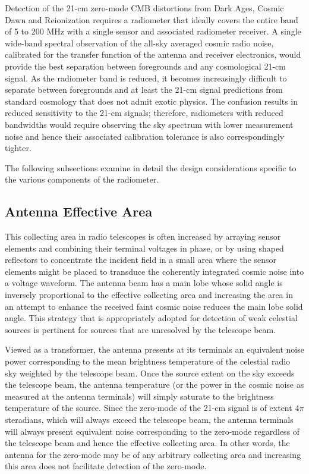Detection of the 21-cm zero-mode CMB distortions from Dark Ages, Cosmic Dawn and Reionization requires a radiometer that ideally covers the entire band of 5 to 200 MHz with a single sensor and associated radiometer receiver.  A single wide-band spectral observation of the all-sky averaged cosmic radio noise, calibrated for the transfer function of the antenna and receiver electronics, would provide the best separation between foregrounds and any cosmological 21-cm signal.  As the radiometer band is reduced, it becomes increasingly difficult to separate between foregrounds and at least the 21-cm signal predictions from standard cosmology that does not admit exotic physics.  The confusion results in reduced sensitivity to the 21-cm signals; therefore, radiometers with reduced bandwidths would require observing the sky spectrum with lower measurement noise and hence their associated calibration tolerance is also correspondingly tighter.

The following subsections examine in detail the design considerations specific to the various components of the radiometer.

\subsection{Antenna Effective Area}
  
   This collecting area in radio telescopes is often increased by arraying sensor elements and combining their terminal voltages in phase, or by using shaped reflectors to concentrate the incident field in a small area where the sensor elements might be placed to transduce the coherently integrated cosmic noise into a voltage waveform.  The antenna beam has a main lobe whose solid angle is inversely proportional to the effective collecting area and increasing the area in an attempt to enhance the received faint cosmic noise reduces the main lobe solid angle.  This strategy that is appropriately adopted for detection of weak celestial sources is pertinent for sources that are unresolved by the telescope beam.  
   
   Viewed as a transformer, the antenna presents at its terminals an equivalent noise power corresponding to the mean brightness temperature of the celestial radio sky weighted by the telescope beam.  Once the source extent on the sky exceeds the telescope beam, the antenna temperature (or the power in the cosmic noise as measured at the antenna terminals) will simply saturate to the brightness temperature of the source.  Since the zero-mode of the 21-cm signal is of extent $4\pi$ steradians, which will always exceed the telescope beam, the antenna terminals will always present equivalent noise corresponding to the zero-mode regardless of the telescope beam and hence the effective collecting area.  In other words, the antenna for the zero-mode may be of any arbitrary collecting area and increasing this area does not facilitate detection of the zero-mode.
   
